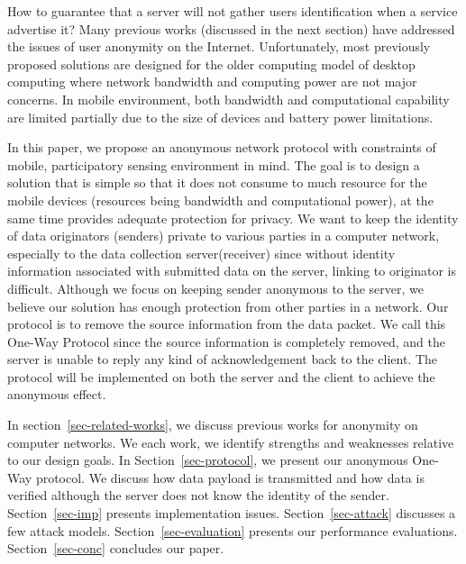 How to guarantee that a server will not gather users identification when
a service advertise it? Many previous works
\cite{DBLP:conf/uss/DingledineMS04} \cite{DBLP:journals/cacm/ReiterR99}
\cite{DBLP:journals/jcs/LevineS02} \cite{DBLP:conf/percom/HuS10}
(discussed in the next section)
have addressed the issues of user anonymity on the Internet. Unfortunately,
most previously proposed solutions are designed for the older computing model
of desktop computing where network bandwidth and computing power are not major concerns.
In mobile environment, both bandwidth and computational capability are limited
partially due to the size of devices and battery power limitations.

In this paper, we propose an anonymous network protocol with constraints
of mobile, participatory sensing environment in mind. The goal is to design a
solution that is simple so that it does not consume to much resource for
the mobile devices (resources being bandwidth and computational power),
at the same time provides adequate protection for privacy.
We want to keep the identity of data originators (senders) private to
various parties in a computer network, especially to the data collection
server(receiver) since without identity information associated with submitted
data on the server, linking to originator is difficult. Although we focus
on keeping sender anonymous to the server, we believe our solution has enough
protection from other parties in a network.
Our protocol is to remove the source information from the data
packet. We call this One-Way Protocol since the source information is
completely removed, and the server is unable to reply any kind of
acknowledgement back to the client. The protocol will be implemented on
both the server and the client to achieve the anonymous effect.

In section~\ref{sec-related-works}, we discuss previous works for anonymity
on computer networks.
We each work, we identify strengths and weaknesses relative to our design
goals.
In Section~\ref{sec-protocol}, we present our anonymous One-Way protocol.
We discuss how data payload is transmitted and how data is verified although
the server does not know the identity of the sender.
Section~\ref{sec-imp} presents implementation issues.
Section~\ref{sec-attack} discusses a few attack models.
Section~\ref{sec-evaluation} presents our performance evaluations.
Section~\ref{sec-conc} concludes our paper.

